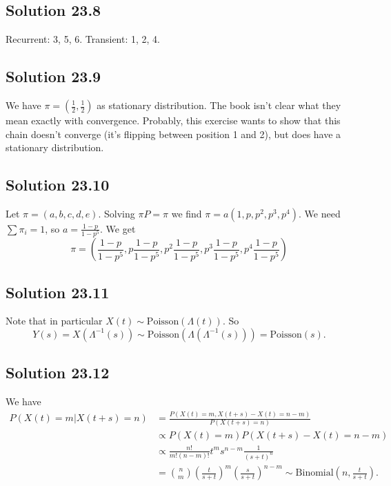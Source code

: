 \subsection*{Solution 23.8}

Recurrent: 3, 5, 6.
Transient: 1, 2, 4.


\subsection*{Solution 23.9}

We have $\pi = (\frac{1}{2}, \frac{1}{2})$ as stationary distribution.
The book isn't clear what they mean exactly with convergence.
Probably, this exercise wants to show that this chain doesn't converge (it's flipping between position 1 and 2), but does have a stationary distribution.


\subsection*{Solution 23.10}

Let $\pi = (a, b, c, d, e)$.
Solving $\pi P = \pi$ we find $\pi = a (1, p, p^2, p^3, p^4)$.
We need $\sum \pi_i = 1$, so $a = \frac{1 - p}{1 - p^5}$.
We get
\begin{equation*}
    \pi = \left(
        \frac{1 - p}{1 - p^5},
        p \frac{1 - p}{1 - p^5},
        p^2 \frac{1 - p}{1 - p^5},
        p^3 \frac{1 - p}{1 - p^5},
        p^4 \frac{1 - p}{1 - p^5}
    \right)
\end{equation*}


\subsection*{Solution 23.11}

Note that in particular $X(t) \sim \mathrm{Poisson}(\Lambda(t))$.
So
\begin{equation*}
    Y(s) = X(\Lambda^{-1}(s)) \sim \mathrm{Poisson}(\Lambda(\Lambda^{-1}(s))) = \mathrm{Poisson}(s).
\end{equation*}


\subsection*{Solution 23.12}

We have
\begin{equation*}
    \begin{split}
        P(X(t) = m | X(t + s) = n)
            &= \frac{P(X(t) = m, X(t + s) - X(t) = n - m)}{P(X(t + s) = n)} \\
            &\propto P(X(t) = m)P(X(t + s) - X(t) = n - m) \\
            &\propto \frac{n!}{m!(n - m)!} t^m s^{n - m} \frac{1}{(s + t)^n} \\
            &= \binom{n}{m} \left(\frac{t}{s + t}\right)^m \left(\frac{s}{s + t}\right)^{n - m}
            \sim \mathrm{Binomial}\left(n, \frac{t}{s + t}\right).
    \end{split}
\end{equation*}

